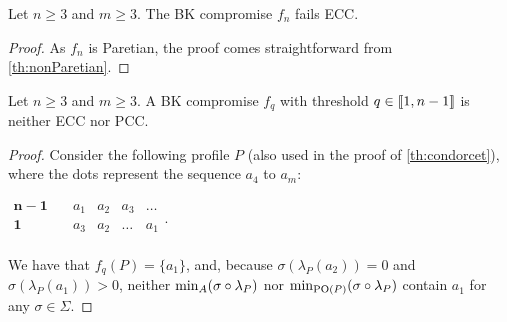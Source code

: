 \begin{theorem}
	\label{th:FBfailsECC}
	Let $n\geq 3$ and $m\geq 3.$ The BK compromise $f_{n}$ fails \ac{ECC}. 
\end{theorem}
\begin{proof}
	As $f_{n}$ is Paretian, the proof comes straightforward from \cref{th:nonParetian}.
\end{proof}

\begin{theorem}
	\label{th:BKthreshold}
	Let $n\geq 3$ and $m\geq 3.$ A BK compromise $f_{q}$ with threshold $q \in \llbracket1, n-1\rrbracket$ is neither \ac{ECC} nor \ac{PCC}.
\end{theorem}
\begin{proof}
	Consider the following profile $P$ (also used in the proof of \cref{th:condorcet}), where the dots represent the sequence $a_4$ to $a_m$:
	\begin{center}
		$
		\begin{array}{cccccc}
			\mathbf{n-1} \quad &a_1&a_2&a_3&\dots\\
			\mathbf{1} \quad &a_3&a_2&\dots&a_1\\
		\end{array}
		$\quad.
	\end{center}
	We have that $f_{q}(P)=\{a_1\}$, and, because $\sigma(\lambda_P(a_2)) = 0$ and $\sigma(\lambda_P(a_1)) > 0$, neither $\musigma$ nor $\mustar$ contain $a_1$ for any $\sigma \in \Sigma$. 
\end{proof}

